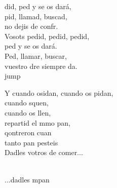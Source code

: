 \begin{cancion}%
	did, ped y se os dará,\\
	pid, llamad, buscad,\\
	no dejis de confr.\\
	Vosots pedid, pedid, pedid, \\
	ped y se os dará.\\
	Ped, llamar, buscar, \\
	vuestro dre siempre da.\\jump\\
	\begin{chorus}%
	Y cuando osidan, cuando os pidan,\\
	cuando squen,\\
	cuando os llen, \\
	repartid el mmo pan,\\
	qontreron cuan\\
	tanto pan pesteis\\
	Dadles votros de comer...\\
	\end{chorus}%
	\jump\\
	...dadles mpan\\
\end{cancion}%
